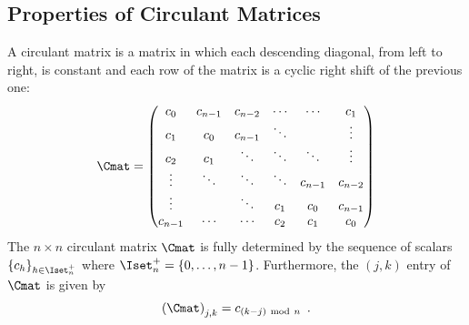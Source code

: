  




\subsection{Properties of Circulant Matrices}
\label{subsection:ch2-properties_of_circulant_matrices}

A circulant matrix is a matrix in which each descending diagonal, from left to right, is constant and each row of the matrix is a cyclic right shift of the previous one:
\begin{equation}
  \Cmat =
  \leftmatrix
    c_0 & c_{n-1} & c_{n-2} & \cdots & \cdots & c_{1} \\
    c_{1} & c_0 & c_{n-1} & \ddots & & \vdots \\
    c_{2} & c_{1} & \ddots & \ddots & \ddots & \vdots \\
    \vdots & \ddots & \ddots & \ddots & c_{n-1} & c_{n-2} \\
    \vdots & & \ddots & c_{1} & c_{0} & c_{n-1} \\
    c_{n-1} & \cdots & \cdots & c_{2} & c_{1} & c_0
  \rightmatrix
\end{equation}
\noindent
The $n \times n$ circulant matrix $\Cmat$ is fully determined by the sequence of scalars $\{c_h\}_{h \in \Iset^+_n}$ where $\Iset^+_n= \{0, \ldots, n-1\}$.
Furthermore, the $(j,k)$ entry of $\Cmat$ is given by
\begin{equation}
  \leftmat \Cmat \rightmat_{j,k} = c_{\left(k-j\right) \mod n} \enspace.
\end{equation}



